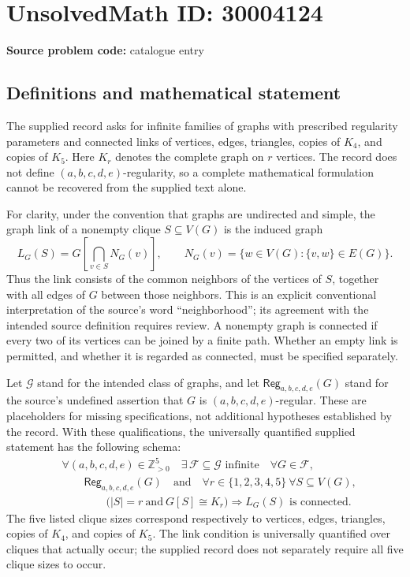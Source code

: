 \documentclass[11pt]{article}
\newcommand{\Z}{\mathbb{Z}}
\begin{document}
\section*{UnsolvedMath ID: 30004124}
\textbf{Source problem code:} catalogue entry
\subsection{Definitions and mathematical statement}
The supplied record asks for infinite families of graphs with prescribed regularity parameters and connected links of vertices, edges, triangles, copies of $K_4$, and copies of $K_5$. Here $K_r$ denotes the complete graph on $r$ vertices. The record does not define $(a,b,c,d,e)$-regularity, so a complete mathematical formulation cannot be recovered from the supplied text alone.

For clarity, under the convention that graphs are undirected and simple, the graph link of a nonempty clique $S\subseteq V(G)$ is the induced graph
\[
L_G(S)=G\!\left[\bigcap_{v\in S}N_G(v)\right],
\qquad
N_G(v)=\{w\in V(G):\{v,w\}\in E(G)\}.
\]
Thus the link consists of the common neighbors of the vertices of $S$, together with all edges of $G$ between those neighbors. This is an explicit conventional interpretation of the source's word ``neighborhood''; its agreement with the intended source definition requires review. A nonempty graph is connected if every two of its vertices can be joined by a finite path. Whether an empty link is permitted, and whether it is regarded as connected, must be specified separately.

Let $\mathscr G$ stand for the intended class of graphs, and let $\mathsf{Reg}_{a,b,c,d,e}(G)$ stand for the source's undefined assertion that $G$ is $(a,b,c,d,e)$-regular. These are placeholders for missing specifications, not additional hypotheses established by the record. With these qualifications, the universally quantified supplied statement has the following schema:
\[
\begin{aligned}
&\forall (a,b,c,d,e)\in\Z_{>0}^{5}\quad
\exists\,\mathcal F\subseteq\mathscr G\text{ infinite}\quad
\forall G\in\mathcal F,\\
&\qquad \mathsf{Reg}_{a,b,c,d,e}(G)
\quad\text{and}\quad
\forall r\in\{1,2,3,4,5\}\ 
\forall S\subseteq V(G),\\
&\qquad\qquad
\bigl(|S|=r\ \text{and}\ G[S]\cong K_r\bigr)
\Longrightarrow L_G(S)\text{ is connected}.
\end{aligned}
\]
The five listed clique sizes correspond respectively to vertices, edges, triangles, copies of $K_4$, and copies of $K_5$. The link condition is universally quantified over cliques that actually occur; the supplied record does not separately require all five clique sizes to occur.
\end{document}
